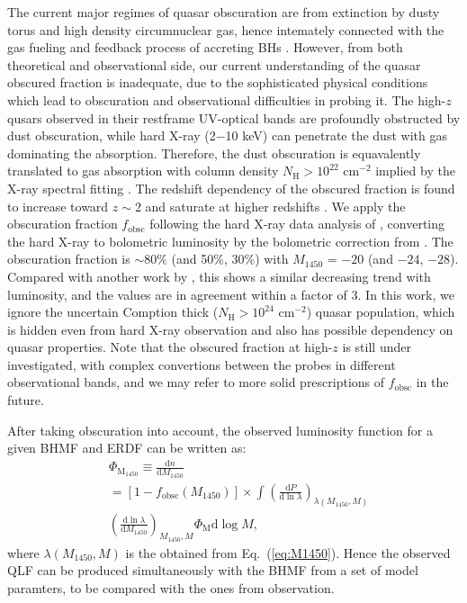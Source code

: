 \documentclass[twocolumn, twocolappendix]{aastex63}
\newcommand{\fobsc}{f_\mathrm{obsc}}
\newcommand{\Muv}{M_{1450}}
\newcommand{\D}{\mathrm{d}}
\begin{document}
\begin{CJK*}{UTF8}{gbsn}
The current major regimes of quasar obscuration are from extinction by dusty torus and high density circumnuclear gas, 
hence intemately connected with the gas fueling and feedback process of accreting BHs \citep[see][for a review]{2018ARA&A..56..625H}.
However, from both theoretical and observational side, our current understanding of the quasar obscured fraction is inadequate, 
due to the sophisticated physical conditions which lead to obscuration and observational difficulties in probing it.
The high-$z$ qusars observed in their restframe UV-optical bands are profoundly obstructed by dust obscuration, 
while hard X-ray (2$-$10 keV) can penetrate the dust with gas dominating the absorption. 
Therefore, the dust obscuration is equavalently translated to gas absorption with column density $N_\mathrm{H}>10^{22}$ cm$^{-2}$ 
implied by the X-ray spectral fitting \citep[e.g.,][]{2003ApJ...598..886U,2007A&A...463...79G,2008A&A...490..905H}.
The redshift dependency of the obscured fraction is found to increase toward $z\sim 2$ and saturate at higher redshifts 
\citep{2008A&A...490..905H,2014ApJ...786..104U,2018MNRAS.473.2378V}.
We apply the obscuration fraction $\fobsc$ following the hard X-ray data analysis of \citet{2014ApJ...786..104U}, 
converting the hard X-ray to bolometric luminosity by the bolometric correction from \citet{2020A&A...636A..73D}.
The obscuration fraction is $\sim80\%$ (and 50\%, 30\%) with $\Muv$ = $-20$ (and $-24$, $-28$). 
Compared with another work by  \citet{2014MNRAS.437.3550M}, this shows a similar decreasing trend with luminosity, 
and the values are in agreement within a factor of 3.
In this work, we ignore the uncertain Comption thick ($N_\mathrm{H}>10^{24}$ cm$^{-2}$) quasar population, which is hidden even from hard X-ray observation 
and also has possible dependency on quasar properties.
Note that the obscured fraction at high-$z$ is still under investigated, 
with complex convertions between the probes in different observational bands,
and we may refer to more solid prescriptions of $\fobsc$ in the future.


After taking obscuration into account, the observed luminosity function for a given BHMF and ERDF can be written as:
\begin{align}
\label{eq:dn_dM1450}
& \Phi_\mathrm{\Muv} \equiv \frac{\D n}{\D \Muv} \nonumber \\
& = \left[1 -\fobsc\left(\Muv\right) \right] \times %
\int_{}^{} \left(\frac{\D P}{\D \ln \lambda}\right)_{\lambda(\Muv, M)}  \nonumber \\
& \left(\frac{\D \ln \lambda}{\D \Muv} \right)_{\Muv, M} \Phi_\mathrm{M} \D \log M,
\end{align}
where $\lambda\left(\Muv,M\right)$ is the obtained from Eq.~(\ref{eq:M1450}).
%
Hence the observed QLF can be produced simultaneously with the BHMF from a set of model paramters, 
to be compared with the ones from observation.


\end{CJK*}
\end{document}
